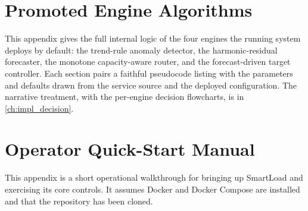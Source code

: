\chapter{Promoted Engine Algorithms}
\label{bm:app-algorithms}

This appendix gives the full internal logic of the four engines the running
system deploys by default: the trend-rule anomaly detector, the harmonic-residual
forecaster, the monotone capacity-aware router, and the forecast-driven target
controller. Each section pairs a faithful pseudocode listing with the parameters
and defaults drawn from the service source and the deployed configuration. The
narrative treatment, with the per-engine decision flowcharts, is in
\cref{ch:impl_decision}.






\chapter{Operator Quick-Start Manual}
\label{bm:app-quickstart}

This appendix is a short operational walkthrough for bringing up SmartLoad and
exercising its core controls. It assumes Docker and Docker Compose are
installed and that the repository has been cloned.

